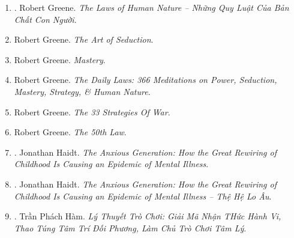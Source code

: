 \documentclass{article}
\begin{document}
\begin{enumerate}
\begin{itemize}
	\end{itemize}
	{\sf About the Author.} {\sc Robert Greene} is the author of the New York Times bestsellers The 48 Laws of Power, The Art of Seduction, The 33 Strategies of War, \& The 50th Law. His highly anticipated fifth book, Mastery, examines the lives of great historical figures such as Charles Darwin, Mozart, Paul Graham \& Henry Ford \& distills the traits \& universal ingredients that made them masters. In addition to having a strong following within the business world \& a deep following in Washington, DC, Greene's books are hailed by everyone from war historians to the biggest musicians in the industry (including Jay-Z \& 50 Cent).

	Greene attended U.C. Berkeley \& the University of Wisconsin at Madison, where he received a degree in classical studies. He currently lives in Los Angeles.

	\item \cite{Greene_laws_human_nature_VN}. {\sc Robert Greene}. {\it The Laws of Human Nature -- Những Quy Luật Của Bản Chất Con Người}.\hfill{\sf[done]}

	\item {\sc Robert Greene}. {\it The Art of Seduction}.

	\item {\sc Robert Greene}. {\it Mastery}.

	\item {\sc Robert Greene}. {\it The Daily Laws: 366 Meditations on Power, Seduction, Mastery, Strategy, \& Human Nature}.

	\item {\sc Robert Greene}. {\it The 33 Strategies Of War}.

	\item {\sc Robert Greene}. {\it The 50th Law}.

	\item \cite{Haidt_anxious_generation}. {\sc Jonathan Haidt}. {\it The Anxious Generation: How the Great Rewiring of Childhood Is Causing an Epidemic of Mental Illness}.

	\item \cite{Haidt_anxious_generation_VN}. {\sc Jonathan Haidt}. {\it The Anxious Generation: How the Great Rewiring of Childhood Is Causing an Epidemic of Mental Illness -- Thệ Hệ Lo Âu}.\hfill{\sf[done]}

	\item \cite{Ham_game_theory_VN}. {\sc Trần Phách Hàm}. {\it Lý Thuyết Trò Chơi: Giải Mã Nhận THức Hành Vi, Thao Túng Tâm Trí Đối Phương, Làm Chủ Trò Chơi Tâm Lý}.\hfill{\sf[reading]}


\end{enumerate}
\end{document}
